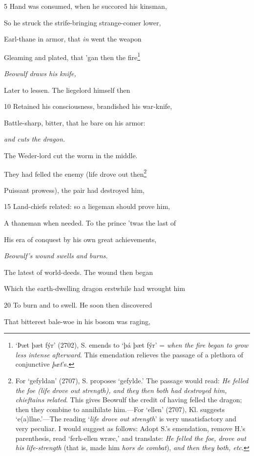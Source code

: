 5
Hand was consumed, when he succored his kinsman,

So he struck the strife-bringing strange-comer lower,

Earl-thane in armor, that \emph{in} went the weapon

Gleaming and plated, that ’gan then the fire\footnote{‘Þæt þæt fýr’ (2702), S. emends to ‘þá þæt fýr’ = \emph{when the fire began to
grow less intense afterward}. This emendation relieves the passage of a
plethora of conjunctive \emph{þæt}’s.}

\emph{Beowulf draws
his knife,}

Later to lessen. The liegelord himself then

10
Retained his consciousness, brandished his war-knife,

Battle-sharp, bitter, that he bare on his armor:

\emph{and cuts the
dragon.}

The Weder-lord cut the worm in the middle.

They had felled the enemy (life drove out then\footnote{For ‘gefyldan’ (2707), S. proposes ‘gefylde.’ The passage would read:
\emph{He felled the foe (life drove out strength), and they then both had destroyed him,
chieftains related}. This gives Beowulf the credit of having felled the dragon;
then they combine to annihilate him.—For ‘ellen’ (2707), Kl. suggests
‘e(a)llne.’—The reading ‘\emph{life drove out strength}’ is very unsatisfactory and
very peculiar. I would suggest as follows: Adopt S.’s emendation, remove
H.’s parenthesis, read ‘ferh-ellen wræc,’ and translate: \emph{He felled the foe,
drove out his life-strength} (that is, made him \emph{hors de combat}), \emph{and then they
both, etc}.}

Puissant prowess), the pair had destroyed him,

15
Land-chiefs related: so a liegeman should prove him,

A thaneman when needed. To the prince ’twas the last of

His era of conquest by his own great achievements,

\emph{Beowulf’s wound
swells and burns.}

The latest of world-deeds. The wound then began

Which the earth-dwelling dragon erstwhile had wrought him

20
To burn and to swell. He soon then discovered

That bitterest bale-woe in his bosom was raging,

